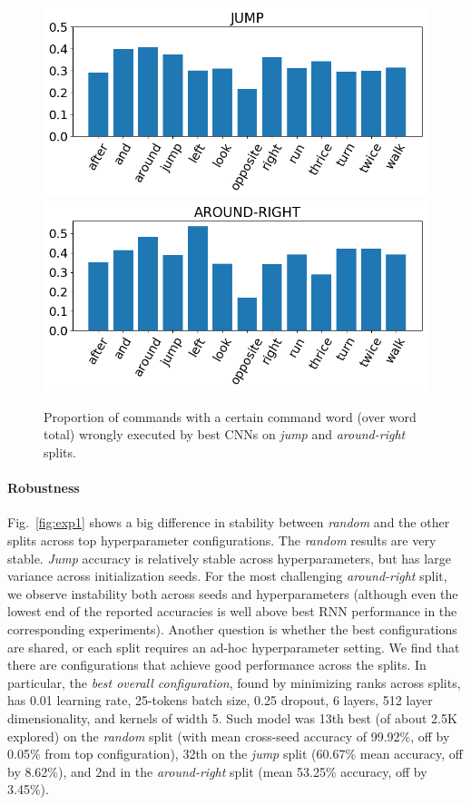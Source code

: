 \begin{figure}[tb]
    \centering
    \includegraphics[width=.45\textwidth,keepaspectratio]{figures/jump_error_dist.png}
    \includegraphics[width=.45\textwidth,keepaspectratio]{figures/template_error_dist.png}
    \caption{Proportion of commands with a certain command word (over word
      total) wrongly executed by best CNNs on
       \emph{jump} and \emph{around-right} splits.}
    \label{fig:error_distributions}
\end{figure}

\paragraph{Robustness} Fig.~\ref{fig:exp1} shows a big difference in
stability between \emph{random} and the other splits across top
hyperparameter configurations. The \emph{random} results are very
stable. \emph{Jump} accuracy is relatively stable across
hyperparameters, but has large variance across initialization
seeds. For the most challenging \emph{around-right} split, we observe
instability both across seeds and hyperparameters (although even the
lowest end of the reported accuracies is well above best RNN
performance in the corresponding experiments). Another question is
whether the best configurations are shared, or each split requires an
ad-hoc hyperparameter setting. We find that there are configurations
that achieve good performance across the splits. In particular, the
\emph{best overall configuration}, found by minimizing ranks across
splits, has 0.01 learning rate, 25-tokens batch size, 0.25
dropout, 6 layers, 512 layer dimensionality, and kernels of width
5. Such model was 13th best (of about 2.5K explored) on the
\emph{random} split (with mean cross-seed accuracy of 99.92\%, off
by 0.05\% from top configuration), 32th on the \emph{jump} split
(60.67\% mean accuracy, off by 8.62\%), and 2nd in the
\emph{around-right} split (mean 53.25\% accuracy, off by 3.45\%).

